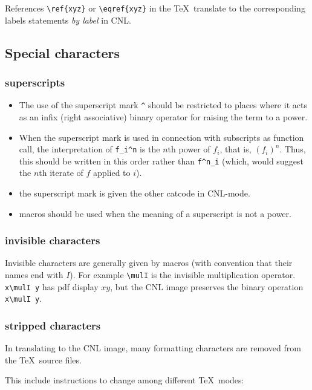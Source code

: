 \documentclass[12pt]{amsart}
\begin{document}
References \verb!\ref{xyz}! or \verb!\eqref{xyz}!  in the
\TeX\ translate to the corresponding labels statements {\it by label}
in CNL.


\subsection{Special characters}

\subsubsection{superscripts}

\begin{itemize}
\item The use of the superscript mark \verb!^! should be restricted
to places where it acts as an infix (right associative) binary
operator for raising the term to a power.
\item When the superscript mark is used in connection with
subscripts as function call, the interpretation of \verb!f_i^n! is
the $n$th power of $f_i$, that is, $(f_i)^n$. 
Thus, this should be written in this
order rather than \verb!f^n_i! (which, would suggest the $n$th iterate
of $f$ applied to $i$).
\item the superscript mark is given the other catcode in CNL-mode.
\item macros should be used when the meaning of a superscript is
not a power.
\end{itemize}

\subsubsection{invisible characters}

Invisible characters are generally given by macros
(with convention that their names end with $I$).  For example
\verb!\mulI! is the invisible multiplication operator.
\verb!x\mulI y! has pdf display $x y$, but the CNL image
preserves the binary operation \verb!x\mulI y!.



\subsubsection{stripped characters}

In translating to the CNL image, 
many formatting characters are removed from the \TeX\ source files.

This include instructions to change among different
\TeX\ modes:  
\end{document}
